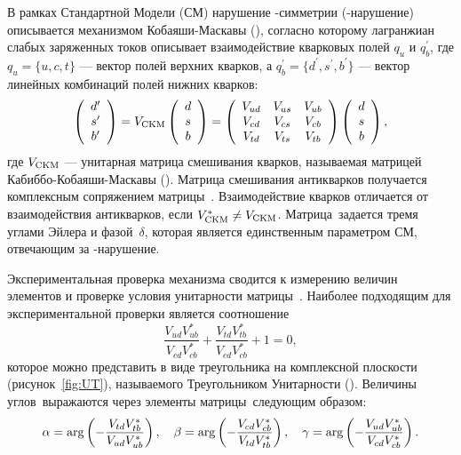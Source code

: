 В рамках Стандартной Модели (СМ) нарушение \cpconj-симметрии (\cpconj-нарушение) описывается механизмом Кобаяши-Маскавы (\km), согласно которому лагранжиан слабых заряженных токов описывает взаимодействие кварковых полей $q_u$ и $q_b^{\prime}$, где $q_u=\{u, c, t\}$ --- вектор полей верхних кварков, а $q_b^{\prime} = \{d^{\prime}, s^{\prime}, b^{\prime}\}$ --- вектор линейных комбинаций полей нижних кварков:
\begin{equation}\label{eq:ckm}
 \left(
 \begin{array}{c}
   d^{\prime} \\
   s^{\prime} \\
   b^{\prime} \\
  \end{array}
  \right)
  = V_{\mathrm{CKM}}
  \left(
  \begin{array}{c}
   d \\ s \\ b \\
  \end{array}
  \right)
  =
  \left(
  \begin{array}{ccc}
   V_{ud} & V_{us} & V_{ub} \\
   V_{cd} & V_{cs} & V_{cb} \\
   V_{td} & V_{ts} & V_{tb} \\
  \end{array}
  \right)\left(
  \begin{array}{c}
   d \\ s \\ b \\
  \end{array}
  \right),
\end{equation}
где $V_{\mathrm{CKM}}$ --- унитарная матрица смешивания кварков, называемая матрицей Кабиббо-Кобаяши-Маскавы (\ckm).  Матрица смешивания антикварков получается комплексным сопряжением матрицы~\vckm.  Взаимодействие кварков отличается от взаимодействия антикварков, если $V_{\mathrm{CKM}}^*\neq V_{\mathrm{CKM}}$.  Матрица~\vckm задается тремя углами Эйлера и фазой~$\delta$, которая является единственным параметром СМ, отвечающим за \cpconj-нарушение.

Экспериментальная проверка механизма \km сводится к измерению величин элементов и проверке условия унитарности матрицы~\ckm.  Наиболее подходящим для экспериментальной проверки является соотношение
\begin{equation}\label{eq:ut}
 \frac{V_{ud}V_{ub}^*}{V_{cd}V_{cb}^*}+\frac{V_{td}V_{tb}^*}{V_{cd}V_{cb}^*} + 1 = 0,
\end{equation}
которое можно представить в виде треугольника на комплексной плоскости (рисунок~\ref{fig:UT}), называемого Треугольником Унитарности (\ut). Величины углов~\ut выражаются через элементы матрицы~\ckm следующим образом:
\begin{equation}\label{eq:ut_angles}
 \alpha = \arg\left(-\frac{V_{td}V^*_{tb}}{V_{ud}V^*_{ub}}\right),\quad
 \beta = \arg\left(-\frac{V_{cd}V^*_{cb}}{V_{td}V^*_{tb}}\right),\quad
 \gamma = \arg\left(-\frac{V_{ud}V^*_{ub}}{V_{cd}V^*_{cb}}\right).
\end{equation}

